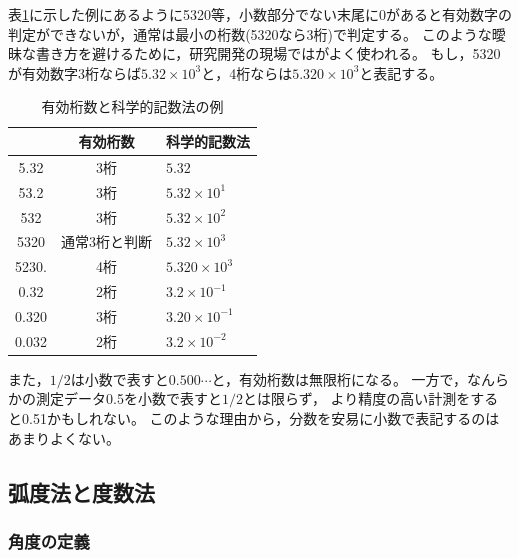 \documentclass[twocolumn,11pt]{jarticle}
\begin{document}
表\ref{tab:sig}に示した例にあるように5320等，小数部分でない末尾に0があると有効数字の判定ができないが，通常は最小の桁数(5320なら3桁)で判定する。
このような曖昧な書き方を避けるために，研究開発の現場ではがよく使われる。
もし，5320が有効数字3桁ならば$5.32\times 10^{3}と$，4桁ならは$5.320\times 10^{3}$と表記する。
\begin{table}
\begin{tabular}{ccl}\hline
&有効桁数&科学的記数法\\\hline
5.32 & 3桁 & $5.32$ \\
53.2 & 3桁 & $5.32\times 10^1$ \\
532  & 3桁 & $5.32\times 10^2$ \\
5320 & 通常3桁と判断 & $5.32\times 10^3$\\
5230. & 4桁 & $5.320\times 10^3$ \\
0.32 & 2桁 & $3.2\times 10^{-1}$\\
0.320 & 3桁& $3.20\times 10^{-1}$\\
0.032 & 2桁& $3.2\times 10^{-2}$\\\hline
\end{tabular}
\caption{\label{tab:sig}有効桁数と科学的記数法の例}
\end{table}


また，$1/2$は小数で表すと$0.500\cdots$と，有効桁数は無限桁になる。
一方で，なんらかの測定データ0.5を小数で表すと$1/2$とは限らず，
より精度の高い計測をすると0.51かもしれない。
このような理由から，分数を安易に小数で表記するのはあまりよくない。

\subsection{弧度法と度数法}
\subsubsection{角度の定義}
\end{document}
